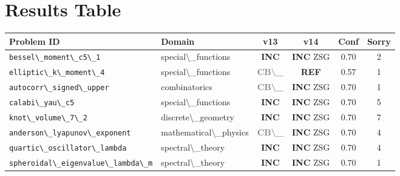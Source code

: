 \documentclass[12pt,a4paper]{article}
\begin{document}
\newpage

\section{Results Table}

\begin{longtable}{llcccc}
\toprule
\textbf{Problem ID} & \textbf{Domain} & \textbf{v13} & \textbf{v14} &
\textbf{Conf} & \textbf{Sorry} \\
\midrule
\endhead
  \texttt{bessel\textbackslash{}_moment\textbackslash{}_c5\textbackslash{}_1} & special\textbackslash{}_functions & \textcolor{incompleteamber}{\textbf{INC}} & \textcolor{incompleteamber}{\textbf{INC}}  \textcolor{sorryred}{ZSG} & 0.70 & 2 \\
  \texttt{elliptic\textbackslash{}_k\textbackslash{}_moment\textbackslash{}_4} & special\textbackslash{}_functions & \textcolor{gray}{\textbf{CB\textbackslash{}_}} & \textcolor{refutedred}{\textbf{REF}}  & 0.57 & 1 \\
  \texttt{autocorr\textbackslash{}_signed\textbackslash{}_upper} & combinatorics & \textcolor{gray}{\textbf{CB\textbackslash{}_}} & \textcolor{incompleteamber}{\textbf{INC}}  \textcolor{sorryred}{ZSG} & 0.70 & 1 \\
  \texttt{calabi\textbackslash{}_yau\textbackslash{}_c5} & special\textbackslash{}_functions & \textcolor{incompleteamber}{\textbf{INC}} & \textcolor{incompleteamber}{\textbf{INC}}  \textcolor{sorryred}{ZSG} & 0.70 & 5 \\
  \texttt{knot\textbackslash{}_volume\textbackslash{}_7\textbackslash{}_2} & discrete\textbackslash{}_geometry & \textcolor{incompleteamber}{\textbf{INC}} & \textcolor{incompleteamber}{\textbf{INC}}  \textcolor{sorryred}{ZSG} & 0.70 & 7 \\
  \texttt{anderson\textbackslash{}_lyapunov\textbackslash{}_exponent} & mathematical\textbackslash{}_physics & \textcolor{gray}{\textbf{CB\textbackslash{}_}} & \textcolor{incompleteamber}{\textbf{INC}}  \textcolor{sorryred}{ZSG} & 0.70 & 4 \\
  \texttt{quartic\textbackslash{}_oscillator\textbackslash{}_lambda} & spectral\textbackslash{}_theory & \textcolor{incompleteamber}{\textbf{INC}} & \textcolor{incompleteamber}{\textbf{INC}}  \textcolor{sorryred}{ZSG} & 0.70 & 4 \\
  \texttt{spheroidal\textbackslash{}_eigenvalue\textbackslash{}_lambda\textbackslash{}_m} & spectral\textbackslash{}_theory & \textcolor{incompleteamber}{\textbf{INC}} & \textcolor{incompleteamber}{\textbf{INC}}  \textcolor{sorryred}{ZSG} & 0.70 & 1 \\

\end{longtable}
\end{document}
